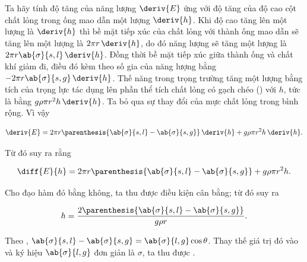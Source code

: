 Ta hãy tính độ tăng của năng lượng $\deriv{E}$ ứng với độ tăng của độ cao cột chất lỏng trong ống mao dẫn một lượng $\deriv{h}$. Khi độ cao tăng lên một lượng là $\deriv{h}$ thì bề mặt tiếp xúc của chất lỏng với thành ống mao dẫn sẽ tăng lên một lượng là $2\pi r\,\deriv{h}$, do đó năng lượng sẽ tăng một lượng là $2\pi r\ab{\sigma}{s,l}\,\deriv{h}$. Đồng thời bề mặt tiếp xúc giữa thành ống và chất khí giảm đi, điều đó kèm theo số gia của năng lượng bằng $-2\pi r\ab{\sigma}{s,g}\,\deriv{h}$. Thế năng trong trọng trường tăng một lượng bằng tích của trọng lực tác dụng lên phần thể tích chất lỏng có gạch chéo () với $h$, tức là bằng $g\rho\pi r^2h\,\deriv{h}$. Ta bỏ qua sự thay đổi của mực chất lỏng trong bình rộng. Vì vậy

\begin{equation*}
	\deriv{E} = 2\pi r\parenthesis{\ab{\sigma}{s,l} - \ab{\sigma}{s,g}}\,\deriv{h} + g\rho\pi r^2h\,\deriv{h}.
\end{equation*}

\noindent

Từ đó suy ra rằng

\begin{equation*}
	\diff{E}{h} = 2\pi r\parenthesis{\ab{\sigma}{s,l} - \ab{\sigma}{s,g}} + g\rho\pi r^2h.
\end{equation*}

\noindent

Cho đạo hàm đó bằng không, ta thu được điều kiện cân bằng; từ đó suy ra

\begin{equation}\label{eq:14_10}
	h = \frac{2\parenthesis{\ab{\sigma}{s,l} - \ab{\sigma}{s,g}}}{g\rho r}.
\end{equation}

\noindent


Theo , $\ab{\sigma}{s,l} - \ab{\sigma}{s,g} = \ab{\sigma}{l,g}\cos\theta$. Thay thế giá trị đó vào  và ký hiệu $\ab{\sigma}{l,g}$ đơn giản là $\sigma$, ta thu được .